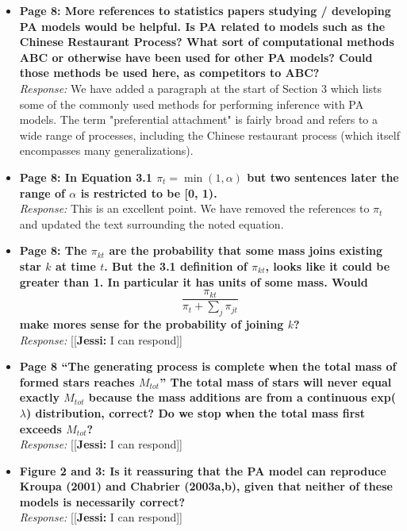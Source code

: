 \documentclass[11pt, oneside]{article}   	%
\newcommand{\jessi}[1]{{\color{blue}[[\textbf{Jessi: }#1]]}}
\begin{document}
\begin{itemize}
\item  {\bf Page 8: More references to statistics papers studying / developing PA models would be helpful. Is PA related to models such as the Chinese Restaurant Process? What sort of computational methods ABC or otherwise have been used for other PA models? Could those methods be used here, as competitors to ABC?} \\

\noindent \emph{Response:} We have added a paragraph at the start of Section 3 which lists some of the commonly used
methods for performing inference with PA models. The term "preferential attachment" is fairly broad and refers to
a wide range of processes, including the Chinese restaurant process (which itself encompasses many generalizations).

\bigskip

\item {\bf Page 8: In Equation 3.1 $\pi_t = \min(1,\alpha)$ but two sentences later the range of $\alpha$ is restricted to be [0, 1).} \\

\noindent \emph{Response:} This is an excellent point.  We have removed the references to $\pi_t$ and updated the text surrounding the noted equation.
\bigskip

\item  {\bf Page 8: The $\pi_{kt}$ are the probability that some mass joins existing star $k$ at time $t$. But the 3.1 definition of $\pi_{kt}$, looks like it could be greater than 1. In particular it has units
of some mass. Would $$\frac{\pi_{kt}}{\pi_t + \sum_j \pi_{jt}}$$
make mores sense for the probability of joining $k$?} \\

\noindent \emph{Response:} \jessi{I can respond}
\bigskip

\item {\bf Page 8 ``The generating process is complete when the total mass of formed stars reaches $M_{tot}$'' The total mass of stars will never equal exactly $M_{tot}$ because the mass additions are from a continuous exp($\lambda$) distribution, correct? Do we stop when the total mass first exceeds $M_{tot}$?}\\

\noindent \emph{Response:} \jessi{I can respond}
\bigskip

\item  {\bf Figure 2 and 3: Is it reassuring that the PA model can reproduce Kroupa (2001) and Chabrier (2003a,b), given that neither of these models is necessarily correct?}\\
\noindent \emph{Response:} \jessi{I can respond}
\bigskip


\end{itemize}
\end{document}
